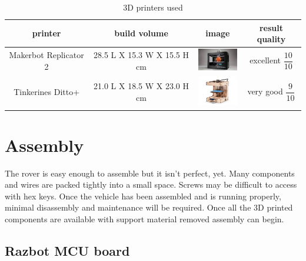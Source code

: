 \documentclass[12pt,titlepage,oneside]{memoir}
\begin{document}
\begin{table}
\begin{tabular}{c | c | c | c}
printer & build volume & image& result quality\\
\hline
Makerbot Replicator 2 & 28.5 L X 15.3 W X 15.5 H cm & \includegraphics[width=70px]{picture/makerbotrep2.jpg} & excellent $\dfrac{10}{10}$\\
Tinkerines Ditto+ & 21.0 L X 18.5 W X 23.0 H cm  & \includegraphics[width=70px]{picture/ditto.jpg} & very good $\dfrac{9}{10}$\\
 
\end{tabular}
\caption{3D printers used}
\label{table:3Dprinters}
\end{table}




\chapter{Assembly}

The rover is easy enough to assemble but it isn't perfect, yet. Many components and wires are packed tightly into a small space. Screws may be difficult to access with hex keys. Once the vehicle has been assembled and is running properly, minimal disassembly and maintenance will be required. Once all the 3D printed components are available with support material removed assembly can begin.\\

\section{Razbot MCU board}
\end{document}
